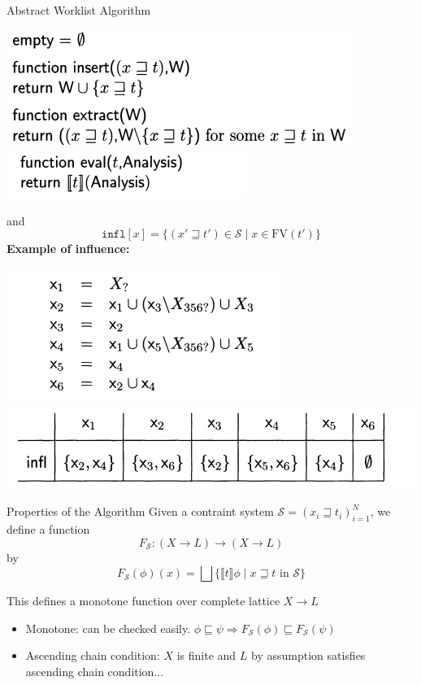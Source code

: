 \documentclass[aspectratio=1610, 13pt]{beamer}
\begin{document}
\begin{frame}{Abstract Worklist Algorithm}
\begin{center}

\includegraphics[scale=0.4]{absAlgo1.png}
\includegraphics[scale=0.4]{absAlgo2.png}
\end{center}
and 
\[\texttt{infl}[x] = \{(x' \sqsupseteq t')\in \mathcal{S} \mid x \in \text{FV}(t')\}\]
\textbf{Example of influence:}
\begin{center}

\includegraphics[scale=0.4]{rdexp3.png}
\includegraphics[scale=0.4]{infl.png}
\end{center}
\end{frame}

\begin{frame}{Properties of the Algorithm}
Given a contraint system $\mathcal{S} = (x_i \sqsupseteq t_i)_{i = 1}^N$, we define a function
\[F_{\mathcal{S}}:(X\rightarrow L) \rightarrow (X\rightarrow L)\]
by
\[F_{\mathcal{S}}(\phi)(x) = \bigsqcup \{\llbracket t \rrbracket \phi \mid x \sqsupseteq t \text{ in }\mathcal{S}\}\]

This defines a monotone function over complete lattice $X \rightarrow L$
\begin{itemize}
\item Monotone: can be checked easily. $\phi \sqsubseteq \psi \Rightarrow {F}_{\mathcal{S}}(\phi) \sqsubseteq {F}_{\mathcal{S}}(\psi)$
\item Ascending chain condition: $X$ is finite and $L$ by assumption satisfies ascending chain condition...
\end{itemize}
\end{frame}
\end{document}
